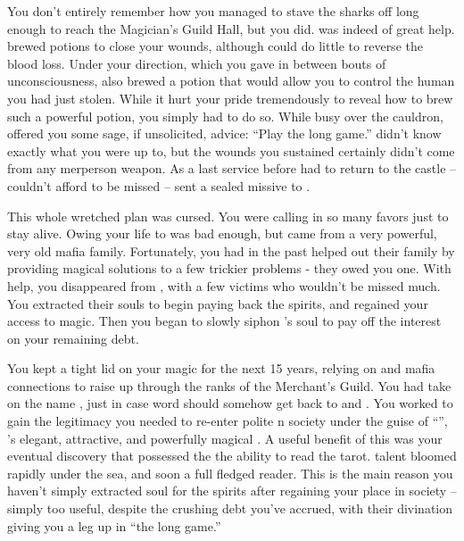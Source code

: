 \documentclass[char]{NeptuneBall}
\begin{document}
You don't entirely remember how you managed to stave the sharks off long enough to reach the Magician's Guild Hall, but you did. \cManta{} was indeed of great help. \cManta{\They} brewed potions to close your wounds, although \cManta{\they} could do little to reverse the blood loss. Under your direction, which you gave in between bouts of unconsciousness, \cManta{} also brewed a potion that would allow you to control the human \cSlave{\prince} you had just stolen. While it hurt your pride tremendously to reveal how to brew such a powerful potion, you simply had to do so. While busy over the cauldron, \cManta{} offered you some sage, if unsolicited, advice: ``Play the long game.'' \cManta{\They} didn't know exactly what you were up to, but the wounds you sustained certainly didn't come from any merperson weapon.  As a last service before \cManta{} had to return to the castle -- \cManta{\they} couldn't afford to be missed -- \cManta{} sent a sealed missive to \cPriest{}.

This whole wretched plan was cursed. You were calling in so many favors just to stay alive. Owing your life to \cManta{} was bad enough, but \cPriest{} came from a very powerful, very old mafia family. Fortunately, you had in the past helped out their family by providing magical solutions to a few trickier problems - they owed you one.  With \cPriest{\their} help, you disappeared from \pAtlantis{}, with a few victims who wouldn't be missed much. You extracted their souls to begin paying back the spirits, and regained your access to magic. Then you began to slowly siphon \cSlave{}'s soul to pay off the interest on your remaining debt.

You kept a tight lid on your magic for the next 15 years, relying on \cPriest{} and \cPriest{\their} mafia connections to raise \cSlave{} up through the ranks of the Merchant's Guild. You had \cSlave{} take on the name \cSlave{\MYname}, just in case word should somehow get back to \cAriel{} and \cEric{}. You worked to gain the legitimacy you needed to re-enter polite \pAtlantis{}n society under the guise of ``\cWitch{\MYname}'', \cSlave{}'s elegant, attractive, and powerfully magical \cWitch{\sibling}. A useful benefit of this was your eventual discovery that \cSlave{\MYname} possessed the the ability to read the tarot. \cSlave{\Their} talent bloomed rapidly under the sea, and \cSlave{\they} \cSlave{\were} soon a full fledged reader. This is the main reason you haven't simply extracted \cSlave{\their} soul for the spirits after regaining your place in society -- \cSlave{\they} \cSlave{\are} simply too useful, despite the crushing debt you've accrued, with their divination giving you a leg up in ``the long game.''
\end{document}
